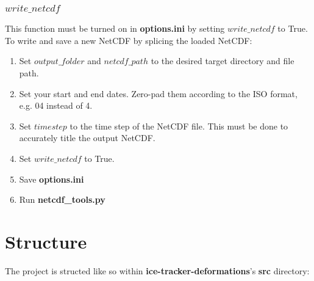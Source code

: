 \documentclass[12pt]{article}
\begin{document}
\subsubsection*{$write\_netcdf$}

This function must be turned on in \textbf{options.ini} by setting $write\_netcdf$ to True. To write and save a new NetCDF by splicing the loaded NetCDF:

\begin{enumerate}
    \item Set $output\_folder$ and $netcdf\_path$ to the desired target directory and file path.
    \item Set your start and end dates. Zero-pad them according to the ISO format, e.g. 04 instead of 4.
    \item Set $timestep$ to the time step of the NetCDF file. This must be done to accurately title the output NetCDF.
    \item Set $write\_netcdf$ to True.
    \item Save \textbf{options.ini}
    \item Run \textbf{netcdf\_tools.py}
\end{enumerate}

\section{Structure}\label{Structure}

The project is structed like so within \textbf{ice-tracker-deformations}'s \textbf{src} directory:

\begin{figure}[H]
    \centering
    \begin{minipage}[b]{.5\textwidth}
    \end{minipage}%
    \begin{minipage}{.5\textwidth}
    \end{minipage}
\end{figure}
\end{document}
